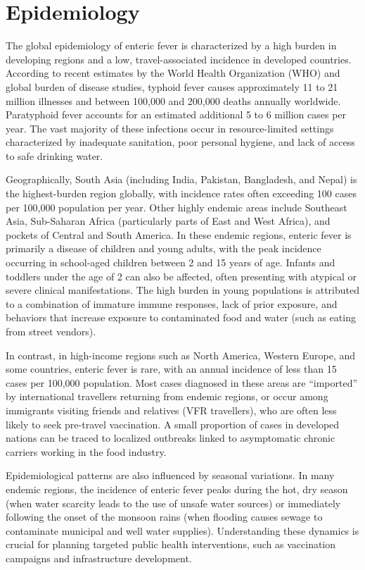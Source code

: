 \section*{Epidemiology}
The global epidemiology of enteric fever is characterized by a high burden in developing regions and a low, travel-associated incidence in developed countries. According to recent estimates by the World Health Organization (WHO) and global burden of disease studies, typhoid fever causes approximately 11 to 21 million illnesses and between 100,000 and 200,000 deaths annually worldwide. Paratyphoid fever accounts for an estimated additional 5 to 6 million cases per year. The vast majority of these infections occur in resource-limited settings characterized by inadequate sanitation, poor personal hygiene, and lack of access to safe drinking water.

Geographically, South Asia (including India, Pakistan, Bangladesh, and Nepal) is the highest-burden region globally, with incidence rates often exceeding 100 cases per 100,000 population per year. Other highly endemic areas include Southeast Asia, Sub-Saharan Africa (particularly parts of East and West Africa), and pockets of Central and South America. In these endemic regions, enteric fever is primarily a disease of children and young adults, with the peak incidence occurring in school-aged children between 2 and 15 years of age. Infants and toddlers under the age of 2 can also be affected, often presenting with atypical or severe clinical manifestations. The high burden in young populations is attributed to a combination of immature immune responses, lack of prior exposure, and behaviors that increase exposure to contaminated food and water (such as eating from street vendors).

In contrast, in high-income regions such as North America, Western Europe, and some countries, enteric fever is rare, with an annual incidence of less than 15 cases per 100,000 population. Most cases diagnosed in these areas are ``imported'' by international travellers returning from endemic regions, or occur among immigrants visiting friends and relatives (VFR travellers), who are often less likely to seek pre-travel vaccination. A small proportion of cases in developed nations can be traced to localized outbreaks linked to asymptomatic chronic carriers working in the food industry.

Epidemiological patterns are also influenced by seasonal variations. In many endemic regions, the incidence of enteric fever peaks during the hot, dry season (when water scarcity leads to the use of unsafe water sources) or immediately following the onset of the monsoon rains (when flooding causes sewage to contaminate municipal and well water supplies). Understanding these dynamics is crucial for planning targeted public health interventions, such as vaccination campaigns and infrastructure development.

